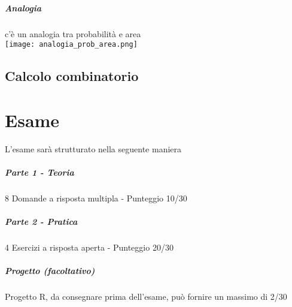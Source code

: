 \documentclass[12pt, a4paper, openany]{book}
\begin{document}
\paragraph{Analogia} c'è un analogia tra probabilità e area
\\\texttt{[image: analogia\_prob\_area.png]}
\section{Calcolo combinatorio}



\chapter{Esame}
L'esame sarà strutturato nella seguente maniera
\paragraph{Parte 1 - Teoria}
8 Domande a risposta multipla - Punteggio 10/30
\paragraph{Parte 2 - Pratica}
4 Esercizi a risposta aperta - Punteggio 20/30
\paragraph{Progetto (facoltativo)}
Progetto R, da consegnare prima dell'esame, può fornire un massimo di 2/30
\end{document}
